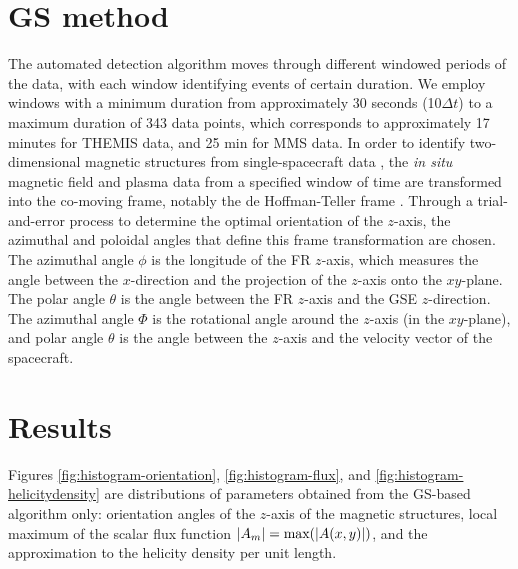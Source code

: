 \section{GS method}
The automated detection algorithm moves through different windowed periods of the data, with each window identifying events of certain duration. We employ windows with a minimum duration from approximately 30 seconds (10$\Delta t$) to a maximum duration of 343 data points, which corresponds to approximately 17 minutes for THEMIS data, and 25 min for MMS data. In order to identify two-dimensional magnetic structures from single-spacecraft data \citep{Paschmann:2008}, the \textit{\textit{in situ}} magnetic field and plasma data from a specified window of time are transformed into the co-moving frame, notably the de Hoffman-Teller frame \citep{deHoffman-Teller:1950}. Through a trial-and-error process to determine the optimal orientation of the $z$-axis, the azimuthal and poloidal angles that define this frame transformation are chosen. The azimuthal angle $\phi$ is the longitude of the FR $z$-axis, which measures the angle between the $x$-direction and the projection of the $z$-axis onto the $xy$-plane. The polar angle $\theta$ is the angle between the FR $z$-axis and the GSE $z$-direction. The azimuthal angle $\Phi$ is the rotational angle around the $z$-axis (in the $xy$-plane), and polar angle $\theta$ is the angle between the $z$-axis and the velocity vector of the spacecraft.

\section{Results}
Figures \ref{fig:histogram-orientation}, \ref{fig:histogram-flux}, and \ref{fig:histogram-helicitydensity} are distributions of parameters obtained from the GS-based algorithm only: orientation angles of the $z$-axis of the magnetic structures, local maximum of the scalar flux function $|A_m| = \textnormal{max}(|A(x,y)|)$, and the approximation to the helicity density per unit length.

